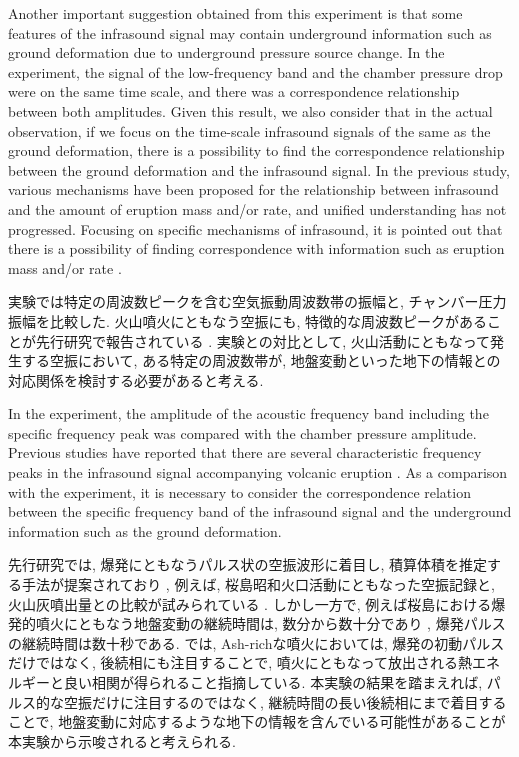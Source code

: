 \documentclass[12pt]{article}
\begin{document}
Another important suggestion obtained from this experiment is that some features of the infrasound signal may contain underground information such as ground deformation due to underground pressure source change.
In the experiment, the signal of the low-frequency band and the chamber pressure drop were on the same time scale, and there was a correspondence relationship between both amplitudes.
Given this result, we also consider that in the actual observation, if we focus on the time-scale infrasound signals of the same as the ground deformation, there is a possibility to find the correspondence relationship between the ground deformation and the infrasound signal.
In the previous study, various mechanisms have been proposed for the relationship between infrasound and the amount of eruption mass and/or rate, and unified understanding has not progressed.
Focusing on specific mechanisms of infrasound, it is pointed out that there is a possibility of finding correspondence with information such as eruption mass and/or rate \citep{Ichihara2016a}.

実験では特定の周波数ピークを含む空気振動周波数帯の振幅と, チャンバー圧力振幅を比較した. 
火山噴火にともなう空振にも, 特徴的な周波数ピークがあることが先行研究で報告されている \citep{yokoo2012bo}. 
実験との対比として, 火山活動にともなって発生する空振において, ある特定の周波数帯が, 地盤変動といった地下の情報との対応関係を検討する必要があると考える.

In the experiment, the amplitude of the acoustic frequency band including the specific frequency peak was compared with the chamber pressure amplitude.
Previous studies have reported that there are several characteristic frequency peaks in the infrasound signal accompanying volcanic eruption \citep{yokoo2012bo}.
As a comparison with the experiment, it is necessary to consider the correspondence relation between the specific frequency band of the infrasound signal and the underground information such as the ground deformation.

先行研究では, 爆発にともなうパルス状の空振波形に着目し, 積算体積を推定する手法が提案されており \citep{Johnson2003}, 例えば, 桜島昭和火口活動にともなった空振記録と, 火山灰噴出量との比較が試みられている \citep{Fee2017a}. 
しかし一方で, 例えば桜島における爆発的噴火にともなう地盤変動の継続時間は, 数分から数十分であり \citep{Iguchi2012, Iguchi2013a}, 爆発パルスの継続時間は数十秒である.
\cite{DelleDonne2016} では, Ash-richな噴火においては, 爆発の初動パルスだけではなく, 後続相にも注目することで, 噴火にともなって放出される熱エネルギーと良い相関が得られること指摘している. 
本実験の結果を踏まえれば, パルス的な空振だけに注目するのではなく, 継続時間の長い後続相にまで着目することで, 地盤変動に対応するような地下の情報を含んでいる可能性があることが本実験から示唆されると考えられる.
\end{document}
